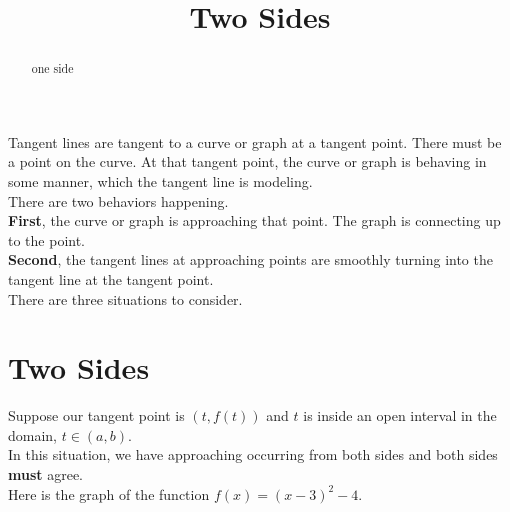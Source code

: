 \documentclass{ximera}
\title{Two Sides}
\begin{document}
\begin{abstract}
one side
\end{abstract}
\maketitle




Tangent lines are tangent to a curve or graph at a tangent point. There must be a point on the curve. At that tangent point, the curve or graph is behaving in some manner, which the tangent line is modeling.  \\

There are two behaviors happening. \\



\textbf{First}, the curve or graph is approaching that point. The graph is connecting up to the point.\\

\textbf{Second}, the tangent lines at approaching points are smoothly turning into the tangent line at the tangent point. \\



There are three situations to consider. \\




\section*{Two Sides}


Suppose our tangent point is $(t, f(t))$ and $t$ is inside an open interval in the domain, $t \in (a, b)$. \\


In this situation, we have approaching occurring from both sides and both sides \textbf{must} agree. \\





Here is the graph of the function $f(x) = (x - 3)^2 - 4$.
\end{document}
